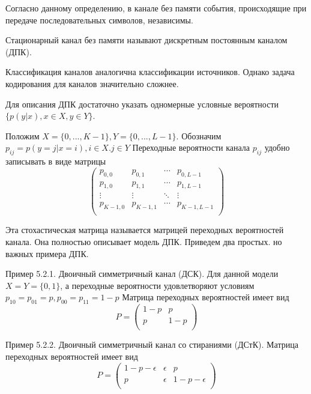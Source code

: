 \documentclass[14pt]{article}
\begin{document}
Согласно данному определению, в канале без памяти события, происходящие при передаче последовательных символов, независимы.

Стационарный канал без памяти называют дискретным постоянным каналом (ДПК).

Классификация каналов аналогична классификации источников. Однако задача кодирования для каналов значительно сложнее.

Для описания ДПК достаточно указать одномерные условные вероятности \(\{p(y|x), x \in X, y \in Y\}\).

Положим \(X = \{0,...,K - 1\}, Y = \{0,...,L - 1\}\). Обозначим \(p_{ij} = p(y = j|x = i), i \in X. j \in Y\) Переходные вероятности канала \(p_{ij}\) удобно записывать в виде матрицы
\begin{displaymath}
 \begin{pmatrix}
     p_{0,0} & p_{0,1} & \cdots & p_{0,L-1} \\
     p_{1,0} & p_{1,1} & \cdots & p_{1,L-1} \\
  \vdots  & \vdots  & \ddots & \vdots  \\
  p_{K-1,0} & p_{K-1,1} & \cdots & p_{K-1,L-1} \\
 \end{pmatrix}
\end{displaymath}

Эта стохастическая матрица называется матрицей переходных вероятностей канала. Она полностью описывает модель ДПК. Приведем два простых. но важных примера ДПК.

Пример 5.2.1. Двоичный симметричный канал (ДСК). Для данной модели \(X = Y = \{0,1\}\), а переходные вероятности удовлетворяют условиям \(p_{10} = p_{01} = p, p_{00} = p_{11} = 1 - p\) Матрица переходных вероятностей имеет вид
\begin{displaymath}
    P = 
 \begin{pmatrix}
     1 - p & p \\
     p & 1 - p \\
 \end{pmatrix}
\end{displaymath}

Пример 5.2.2. Двоичный симметричный канал со стираниями (ДСтК). Матрица переходных вероятностей имеет вид
\begin{displaymath}
    P = 
 \begin{pmatrix}
     1 - p - \epsilon & \epsilon & p \\
     p & \epsilon & 1 - p - \epsilon \\
 \end{pmatrix}
\end{displaymath}
\end{document}
